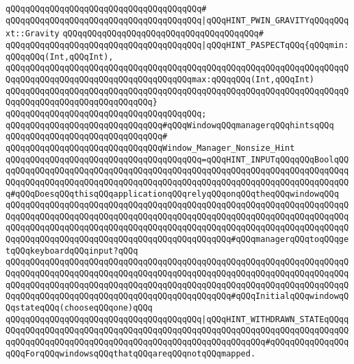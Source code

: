 \verb|qQQqqQQqqQQqqQQqqQQqqQQqqQQqqQQqqQQqqQQq#|\newline
\verb|qQQqqQQqqQQqqQQqqQQqqQQqqQQqqQQqqQQqqQQq|\verb#|qQQqHINT_PWIN_GRAVITYqQQqqQQqxt::Gravity#\newline
\verb|qQQqqQQqqQQqqQQqqQQqqQQqqQQqqQQqqQQqqQQq#|\newline
\verb|qQQqqQQqqQQqqQQqqQQqqQQqqQQqqQQqqQQqqQQq|\verb#|qQQqHINT_PASPECTqQQq{qQQqmin:qQQqqQQq(Int,qQQqInt),#\newline
\verb|qQQqqQQqqQQqqQQqqQQqqQQqqQQqqQQqqQQqqQQqqQQqqQQqqQQqqQQqqQQqqQQqqQQqqQQqqQQqqQQqqQQqqQQqqQQqqQQqqQQqqQQqqQQqmax:qQQqqQQq(Int,qQQqInt)|\newline
\verb|qQQqqQQqqQQqqQQqqQQqqQQqqQQqqQQqqQQqqQQqqQQqqQQqqQQqqQQqqQQqqQQqqQQqqQQqqQQqqQQqqQQqqQQqqQQqqQQqqQQq}|\newline
\verb|qQQqqQQqqQQqqQQqqQQqqQQqqQQqqQQqqQQqqQQq;|\newline
\newline
\newline
\verb|qQQqqQQqqQQqqQQqqQQqqQQqqQQqqQQq#qQQqWindowqQQqmanagerqQQqhintsqQQq|\newline
\verb|qQQqqQQqqQQqqQQqqQQqqQQqqQQqqQQq#|\newline
\verb|qQQqqQQqqQQqqQQqqQQqqQQqqQQqqQQqWindow_Manager_Nonsize_Hint|\newline
\verb|qQQqqQQqqQQqqQQqqQQqqQQqqQQqqQQqqQQqqQQq=qQQqHINT_INPUTqQQqqQQqBoolqQQqqQQqqQQqqQQqqQQqqQQqqQQqqQQqqQQqqQQqqQQqqQQqqQQqqQQqqQQqqQQqqQQqqQQqqQQqqQQqqQQqqQQqqQQqqQQqqQQqqQQqqQQqqQQqqQQqqQQqqQQqqQQqqQQqqQQqqQQqqQQq#qQQqDoesqQQqthisqQQqapplicationqQQqrelyqQQqonqQQqtheqQQqwindowqQQq|\newline
\verb|qQQqqQQqqQQqqQQqqQQqqQQqqQQqqQQqqQQqqQQqqQQqqQQqqQQqqQQqqQQqqQQqqQQqqQQqqQQqqQQqqQQqqQQqqQQqqQQqqQQqqQQqqQQqqQQqqQQqqQQqqQQqqQQqqQQqqQQqqQQqqQQqqQQqqQQqqQQqqQQqqQQqqQQqqQQqqQQqqQQqqQQqqQQqqQQqqQQqqQQqqQQqqQQqqQQqqQQqqQQqqQQqqQQqqQQqqQQqqQQqqQQqqQQqqQQqqQQq#qQQqmanagerqQQqtoqQQqgetqQQqkeyboardqQQqinput?qQQq|\newline
\verb|qQQqqQQqqQQqqQQqqQQqqQQqqQQqqQQqqQQqqQQqqQQqqQQqqQQqqQQqqQQqqQQqqQQqqQQqqQQqqQQqqQQqqQQqqQQqqQQqqQQqqQQqqQQqqQQqqQQqqQQqqQQqqQQqqQQqqQQqqQQqqQQqqQQqqQQqqQQqqQQqqQQqqQQqqQQqqQQqqQQqqQQqqQQqqQQqqQQqqQQqqQQqqQQqqQQqqQQqqQQqqQQqqQQqqQQqqQQqqQQqqQQqqQQqqQQqqQQq#qQQqInitialqQQqwindowqQQqstateqQQq(chooseqQQqone)qQQq|\newline
\verb|qQQqqQQqqQQqqQQqqQQqqQQqqQQqqQQqqQQqqQQq|\verb#|qQQqHINT_WITHDRAWN_STATEqQQqqQQqqQQqqQQqqQQqqQQqqQQqqQQqqQQqqQQqqQQqqQQqqQQqqQQqqQQqqQQqqQQqqQQqqQQqqQQqqQQqqQQqqQQqqQQqqQQqqQQqqQQqqQQqqQQqqQQqqQQqqQQq#\verb|#qQQqqQQqqQQqqQQqqQQqForqQQqwindowsqQQqthatqQQqareqQQqnotqQQqmapped.|\newline
